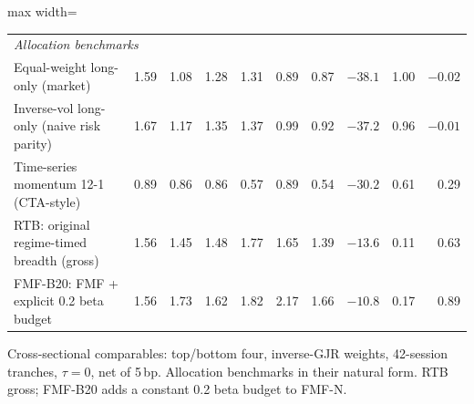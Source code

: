 \begin{table}[t]
\begin{adjustbox}{max width=\textwidth}
\begin{tabular}{lrrrrrrrrr}
\midrule
\multicolumn{10}{l}{\emph{Allocation benchmarks}}\\
Equal-weight long-only (market) & 1.59 & 1.08 & 1.28 & 1.31 & 0.89 & 0.87 & $-38.1$ & 1.00 & $-0.02$\\
Inverse-vol long-only (naive risk parity) & 1.67 & 1.17 & 1.35 & 1.37 & 0.99 & 0.92 & $-37.2$ & 0.96 & $-0.01$\\
Time-series momentum 12-1 (CTA-style) & 0.89 & 0.86 & 0.86 & 0.57 & 0.89 & 0.54 & $-30.2$ & 0.61 & 0.29\\
RTB: original regime-timed breadth (gross) & 1.56 & 1.45 & 1.48 & 1.77 & 1.65 & 1.39 & $-13.6$ & 0.11 & 0.63\\
FMF-B20: FMF + explicit 0.2 beta budget & 1.56 & 1.73 & 1.62 & 1.82 & 2.17 & 1.66 & $-10.8$ & 0.17 & 0.89\\
\bottomrule
\end{tabular}\end{adjustbox}
\par\smallskip\begin{minipage}{0.97\textwidth}\footnotesize Cross-sectional comparables: top/bottom four, inverse-GJR weights, 42-session tranches, $\tau=0$, net of 5\,bp. Allocation benchmarks in their natural form. RTB gross; FMF-B20 adds a constant 0.2 beta budget to FMF-N.\end{minipage}
\end{table}

